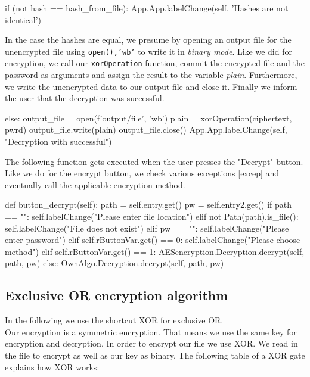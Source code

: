 \documentclass[]{article}
\begin{document}
\begin{python}
if (not hash == hash_from_file):
    App.App.labelChange(self, 'Hashes are not identical')
\end{python}
\noindent
In the case the hashes are equal, we presume by opening an output file for the unencrypted file using 
\texttt{open(),'wb'} to write it in \textit{binary mode}. Like we did for encryption, we call our \texttt{xorOperation}
function, commit the encrypted file and the password as arguments and assign the result to the variable \textit{plain}.
Furthermore, we write the unencrypted data to our output file and close it. Finally we inform the user that the 
decryption was successful.

\begin{python}
else:
    output_file = open(f'output/{file}', 'wb')
    plain = xorOperation(ciphertext, pwrd)
    output_file.write(plain)
    output_file.close()
    App.App.labelChange(self, "Decryption with successful")
\end{python}
\noindent
The following function gets executed when the user presses the "Decrypt" button. Like we do for the encrypt button,
we check various exceptions \ref{excep} and eventually call the applicable encryption method.

\begin{python}
def button_decrypt(self):
    path = self.entry.get()
    pw = self.entry2.get() 
    if path == "":
        self.labelChange("Please enter file location")
    elif not Path(path).is_file():
        self.labelChange("File does not exist")
    elif pw == "":
        self.labelChange("Please enter password")
    elif self.rButtonVar.get() == 0:
        self.labelChange("Please choose method")
    elif self.rButtonVar.get() == 1:
        AESencryption.Decryption.decrypt(self, path, pw)
    else:
        OwnAlgo.Decryption.decrypt(self, path, pw)
\end{python}


\subsection{Exclusive OR encryption algorithm} \label{XOR}
In the following we use the shortcut XOR for exclusive OR.\\
Our encryption is a symmetric encryption. That means we use the same key for encryption and decryption. 
In order to encrypt our file we use XOR. We read in the file to encrypt as well as our key as binary. The
following table of a XOR gate explains how XOR works:
\end{document}
